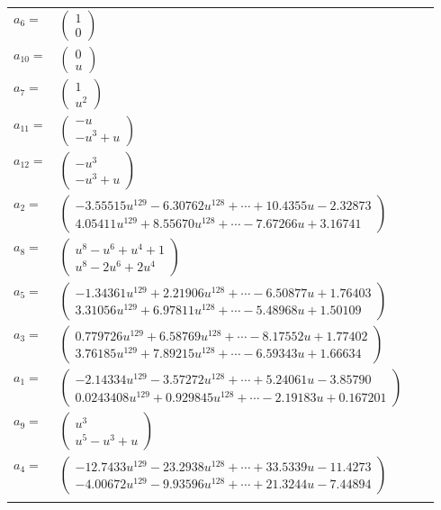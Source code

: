\documentclass[1p]{elsarticle_modified}
\theoremstyle{definition}
\begin{document}
\begin{tabular}{m{7pt} m{180pt} m{7pt} m{180pt} }
\flushright $a_{6}=$&$\begin{pmatrix}1\\0\end{pmatrix}$ \\
\flushright $a_{10}=$&$\begin{pmatrix}0\\u\end{pmatrix}$ \\
\flushright $a_{7}=$&$\begin{pmatrix}1\\u^2\end{pmatrix}$ \\
\flushright $a_{11}=$&$\begin{pmatrix}- u\\- u^3+u\end{pmatrix}$ \\
\flushright $a_{12}=$&$\begin{pmatrix}- u^3\\- u^3+u\end{pmatrix}$ \\
\flushright $a_{2}=$&$\begin{pmatrix}-3.55515 u^{129}-6.30762 u^{128}+\cdots+10.4355 u-2.32873\\4.05411 u^{129}+8.55670 u^{128}+\cdots-7.67266 u+3.16741\end{pmatrix}$ \\
\flushright $a_{8}=$&$\begin{pmatrix}u^8- u^6+u^4+1\\u^8-2 u^6+2 u^4\end{pmatrix}$ \\
\flushright $a_{5}=$&$\begin{pmatrix}-1.34361 u^{129}+2.21906 u^{128}+\cdots-6.50877 u+1.76403\\3.31056 u^{129}+6.97811 u^{128}+\cdots-5.48968 u+1.50109\end{pmatrix}$ \\
\flushright $a_{3}=$&$\begin{pmatrix}0.779726 u^{129}+6.58769 u^{128}+\cdots-8.17552 u+1.77402\\3.76185 u^{129}+7.89215 u^{128}+\cdots-6.59343 u+1.66634\end{pmatrix}$ \\
\flushright $a_{1}=$&$\begin{pmatrix}-2.14334 u^{129}-3.57272 u^{128}+\cdots+5.24061 u-3.85790\\0.0243408 u^{129}+0.929845 u^{128}+\cdots-2.19183 u+0.167201\end{pmatrix}$ \\
\flushright $a_{9}=$&$\begin{pmatrix}u^3\\u^5- u^3+u\end{pmatrix}$ \\
\flushright $a_{4}=$&$\begin{pmatrix}-12.7433 u^{129}-23.2938 u^{128}+\cdots+33.5339 u-11.4273\\-4.00672 u^{129}-9.93596 u^{128}+\cdots+21.3244 u-7.44894\end{pmatrix}$\\&\end{tabular}
\end{document}
